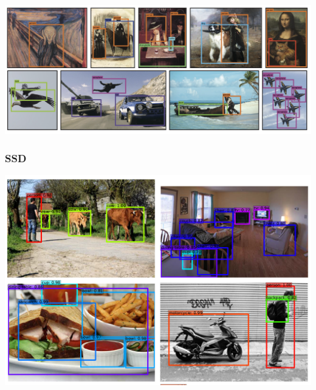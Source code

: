\begin{frame}[allowframebreaks]
\begin{center}
	\includegraphics[scale=0.5]{figs/YOLO_results_pictures}
\end{center}


\end{frame}


\begin{frame}
	\frametitle{SSD}
	
	\begin{center}
		\includegraphics[scale=0.6]{figs/SSD_results_pictures}
	\end{center}
	
\end{frame}

